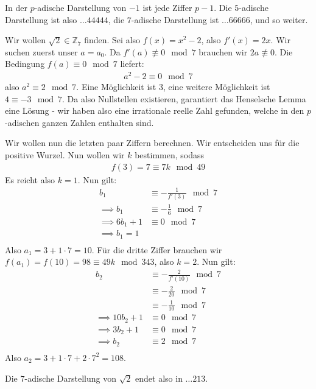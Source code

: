 \documentclass{report}
\newcommand*{\newpar}{\par\vspace{\baselineskip}\noindent}
\newcommand{\bZ}{\mathbb{Z}}
\begin{document}
	\begin{proposition}
		In der $p$-adische Darstellung von $-1$ ist jede Ziffer $p-1$. Die $5$-adische Darstellung ist also $\hdots44444$, die $7$-adische Darstellung ist $\hdots66666$, und so weiter.
	\end{proposition}
	\fi
	\begin{example}
		Wir wollen $\sqrt{2} \in \bZ_7$ finden. Sei also $f(x) = x^2 - 2$, also $f'(x) = 2x$. Wir suchen zuerst unser $a = a_0$. Da $f'(a) \not\equiv 0 \mod 7$ brauchen wir $2a \not\equiv 0$. Die Bedingung $f(a) \equiv 0 \mod 7$ liefert:
		\begin{align*}
			a^2 - 2 \equiv 0 \mod 7
		\end{align*}
		also $a^2 \equiv 2 \mod 7$. Eine Möglichkeit ist $3$, eine weitere Möglichkeit ist $4 \equiv -3 \mod 7$. Da also Nullstellen existieren, garantiert das Henselsche Lemma eine Lösung - wir haben also eine irrationale reelle Zahl gefunden, welche in den $p$-adischen ganzen Zahlen enthalten sind.
		\newpar
		Wir wollen nun die letzten paar Ziffern berechnen. Wir entscheiden uns für die positive Wurzel. Nun wollen wir $k$ bestimmen, sodass
		\begin{align*}
			f(3) = 7 \equiv 7k \mod 49
		\end{align*}
		Es reicht also $k = 1$. Nun gilt:
		\begin{align*}
			b_1 &\equiv -\frac{1}{f'(3)} \mod 7\\
			\implies b_1 &\equiv -\frac{1}{6} \mod 7\\
			\implies 6b_1 + 1 &\equiv 0 \mod 7\\
			\implies b_1 = 1\\
		\end{align*}
		Also $a_1 = 3 + 1 \cdot 7 = 10$.
		Für die dritte Ziffer brauchen wir $f(a_1) = f(10) = 98 \equiv 49k \mod 343$, also $k = 2$. Nun gilt:
		\begin{align*}
			b_2 &\equiv -\frac{2}{f'(10)} \mod 7 \\
				&\equiv -\frac{2}{20} \mod 7 \\
				&\equiv -\frac{1}{10} \mod 7 \\
			\implies 10b_2 + 1 &\equiv 0 \mod 7\\
			\implies 3b_2 + 1 &\equiv 0 \mod 7\\
			\implies b_2 &\equiv 2 \mod 7\\
		\end{align*} 
		Also $a_2 = 3 + 1 \cdot 7 + 2 \cdot 7^2 = 108$.
		\newpar
		Die $7$-adische Darstellung von $\sqrt{2}$ endet also in $\hdots213$.
	\end{example}
\end{document}
